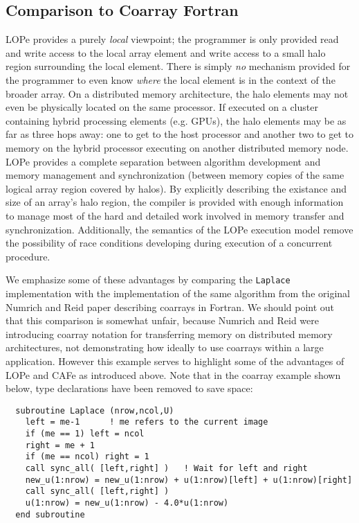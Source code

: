 \subsection{Comparison to Coarray Fortran}

LOPe provides a purely \emph{local} viewpoint; the programmer is only provided read and write access
to the local array element and write access to a small halo region surrounding the local element.
There is simply \emph{no} mechanism provided for the programmer to even know \emph{where} the local
element is in the context of the broader array.  On a distributed memory architecture, the halo
elements may not even be physically located on the same processor.  If executed on a cluster
containing hybrid processing elements (e.g. GPUs), the halo elements may be as far as three hops
away: one to get to the host processor and another two to get to memory on the hybrid processor
executing on another distributed memory node.  LOPe provides a complete separation between algorithm
development and memory management and synchronization (between memory copies of the same logical
array region covered by halos).  By explicitly describing the existance and size of an array's halo
region, the compiler is provided with enough information to manage most of the hard and detailed
work involved in memory transfer and synchronization.  Additionally, the semantics of the LOPe
execution model remove the possibility of race conditions developing during execution of a
concurrent procedure.

We emphasize some of these advantages by comparing the \texttt{Laplace} implementation with the
implementation of the same algorithm from the original Numrich and Reid paper describing coarrays in
Fortran.  We should point out that this comparison is somewhat unfair, because Numrich and Reid were
introducing coarray notation for transferring memory on distributed memory architectures, not
demonstrating how ideally to use coarrays within a large application.
However this example serves
to highlight some of the advantages of LOPe and CAFe as introduced above.  Note that in the coarray
example shown below, type declarations have been removed to save space:
{\small \begin{verbatim}
  subroutine Laplace (nrow,ncol,U)
    left = me-1      ! me refers to the current image
    if (me == 1) left = ncol
    right = me + 1
    if (me == ncol) right = 1
    call sync_all( [left,right] )   ! Wait for left and right
    new_u(1:nrow) = new_u(1:nrow) + u(1:nrow)[left] + u(1:nrow)[right]
    call sync_all( [left,right] )
    u(1:nrow) = new_u(1:nrow) - 4.0*u(1:nrow)
  end subroutine
\end{verbatim}}

